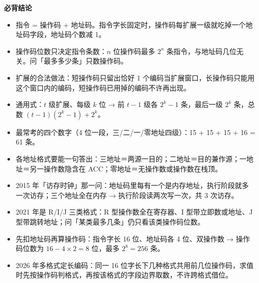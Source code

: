 \documentclass[10pt,a4paper]{ctexart}
\begin{document}



\textbf{必背结论}

\begin{itemize}

\item 指令 = 操作码 + 地址码。指令字长固定时，操作码每扩展一级就吃掉一个地址码字段，地址码个数减 1。

\item 操作码位数只决定指令条数：$n$ 位操作码最多 $2^{n}$ 条指令，与地址码几位无关。问「最多多少条」只数操作码。

\item 扩展的合法做法：短操作码只留出恰好 1 个编码当扩展窗口，长操作码只能用这个窗口内的编码，短操作码已用掉的编码不许再出现。

\item 通用式：$t$ 级扩展、每级 $k$ 位 → 前 $t-1$ 级各 $2^{k}-1$ 条，最后一级 $2^{k}$ 条，总数 $(t-1)(2^{k}-1)+2^{k}$。

\item 最常考的四个数字（4 位一段，三/二/一/零地址四级）：15 + 15 + 15 + 16 = 61 条。

\item 各地址格式要能一句答出：三地址＝两源一目的；二地址＝目的兼作源；一地址＝另一操作数隐含在 ACC；零地址＝无操作数或操作数在栈顶。

\item 2015 年「访存时钟」那一问：地址码里每有一个是内存地址，执行阶段就多一次访存；三个地址全在内存 → 执行阶段读两次写一次，共 3 次访存。

\item 2021 年是 R/I/J 三类格式：R 型操作数全在寄存器、I 型带立即数或地址、J 型带跳转地址；问「某类最多几条」仍只看该类操作码位数。

\item 先扣地址码再算操作码：指令字长 16 位、地址码各 4 位、双操作数 → 操作码位数为 $16-4\times2=8$ 位，最多 $2^{8}=256$ 条。

\item 2026 年多格式定长编码：同一 16 位字长下几种格式共用前几位操作码，求值时先按操作码判格式，再按该格式的字段边界取数，不许跨格式借位。

\end{itemize}
\end{document}
